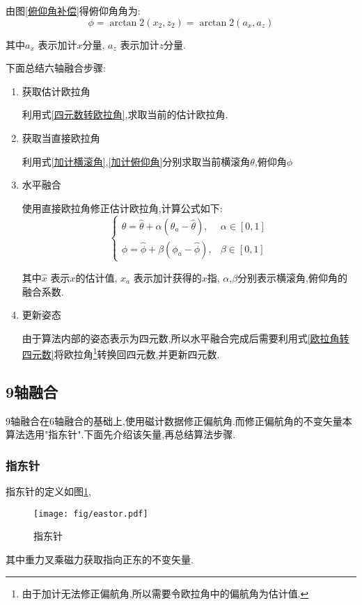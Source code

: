 由图\ref{俯仰角补偿}得俯仰角角为:
\begin{equation}\label{加计俯仰角}
    \phi = \arctan2(x_2,z_2) = \arctan2(a_x,a_z)
\end{equation} 

其中$a_x$   表示加计$x$分量,
$a_z$       表示加计$z$分量.

下面总结六轴融合步骤:
\begin{enumerate}
    \item 获取估计欧拉角

        利用式\ref{四元数转欧拉角},求取当前的估计欧拉角.
    \item 获取当直接欧拉角

        利用式\ref{加计横滚角},\ref{加计俯仰角}分别求取当前横滚角$\theta$,俯仰角$\phi$
    \item 水平融合

        使用直接欧拉角修正估计欧拉角,计算公式如下:
        \begin{equation}\label{水平融合}
            \left\{\!\!\!\begin{array}{ll}
                    \theta = \hat{\theta} + \alpha(\theta_a - \hat{\theta}), & \alpha \in [0, 1] \\
                    \phi   = \hat{\phi} + \beta(\phi_a - \hat{\phi}), & \beta \in [0, 1]
                \end{array}\right.
            \end{equation} 
            
            其中$\hat{x}$   表示$x$的估计值, 
            $x_a$           表示加计获得的$x$指,
            $\alpha$,$\beta$分别表示横滚角,俯仰角的融合系数.
    \item 更新姿态

        由于算法内部的姿态表示为四元数,所以水平融合完成后需要利用式\ref{欧拉角转四元数}将欧拉角\footnote{由于加计无法修正偏航角,所以需要令欧拉角中的偏航角为估计值.}转换回四元数,并更新四元数.
\end{enumerate}

\subsection{9轴融合}
9轴融合在6轴融合的基础上,使用磁计数据修正偏航角.而修正偏航角的不变矢量本算法选用"指东针".下面先介绍该矢量,再总结算法步骤.
\subsubsection{指东针}
指东针的定义如图\ref{指东针},
\begin{figure}[h]
\begin{center}
    \texttt{[image: fig/eastor.pdf]}
    \caption{指东针}\label{指东针}
\end{center}
\end{figure}
其中重力叉乘磁力获取指向正东的不变矢量.

